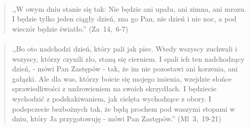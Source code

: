 \documentclass[10pt,a4paper,oneside]{article}
\begin{document}
\paragraph{}
\begin{quote}
,,W owym dniu stanie się tak: Nie będzie ani upału, ani zimna, ani mrozu. I będzie tylko jeden ciągły dzień, zna go Pan, nie dzień i nie noc, a pod wieczór będzie światło.'' \mbox{(Za 14, 6-7)}
\end{quote}
\paragraph{}
\begin{quote}
,,Bo oto nadchodzi dzień, który pali jak piec. Wtedy wszyscy zuchwali i wszyscy, którzy czynili zło, staną się cierniem. I spali ich ten nadchodzący dzień, - mówi Pan Zastępów - tak, że im nie pozostawi ani korzenia, ani gałązki. Ale dla was, którzy boicie się mojego imienia, wzejdzie słońce sprawiedliwości z uzdrowieniem na swoich skrzydłach. I będziecie wychodzić z podskakiwaniem, jak cielęta wychodzące z obory. I podepczecie bezbożnych tak, że będą prochem pod waszymi stopami w dniu, który Ja przygotowuję - mówi Pan Zastępów.'' \mbox{(Ml 3, 19-21)}
\end{quote}
\end{document}
